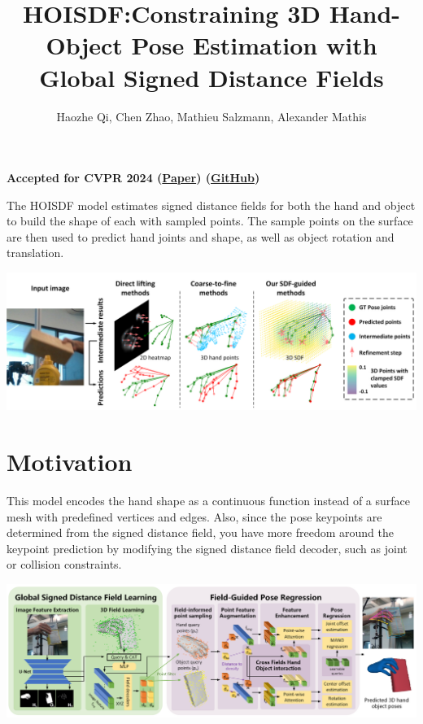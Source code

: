 \documentclass{article}
\title{HOISDF:\@ Constraining 3D Hand-Object Pose Estimation with Global Signed Distance Fields}
\author{Haozhe Qi, Chen Zhao, Mathieu Salzmann, Alexander Mathis}
\date{}
\begin{document}
\maketitle

\begin{center}\textbf{Accepted for CVPR 2024 (\href{https://arxiv.org/pdf/2402.17062}{Paper}) (\href{https://github.com/amathislab/HOISDF}{GitHub})}\end{center}

The HOISDF model estimates signed distance fields for both the hand and object to build the shape of each with sampled points. The sample points on the surface are then used to predict hand joints and shape, as well as object rotation and translation.

\begin{center}
    \includegraphics[scale=0.4]{hoisdf-1.png}
\end{center}

\section*{Motivation}
This model encodes the hand shape as a continuous function instead of a surface mesh with predefined vertices and edges. Also, since the pose keypoints are determined from the signed distance field, you have more freedom around the keypoint prediction by modifying the signed distance field decoder, such as joint or collision constraints.

\begin{center}
    \includegraphics[scale=0.4]{hoisdf-2.png}
\end{center}
\end{document}

